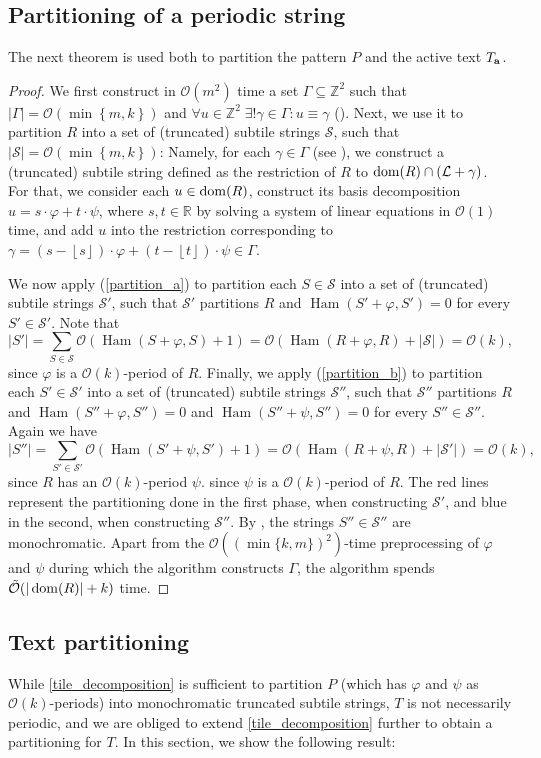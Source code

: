 \documentclass[11pt, letterpaper]{article}
\theoremstyle{plain}
\theoremstyle{definition}
\theoremstyle{remark}
\newcommand{\R}{\mathbb{R}}
\newcommand{\Z}{\mathbb{Z}}
\renewcommand{\O}{\mathcal{O}}
\newcommand{\tO}{\tilde{\mathcal{O}}}
\renewcommand{\S}{\mathcal{S}}
\renewcommand{\L}{\mathcal{L}}
\renewcommand{\phi}{\varphi}
\newcommand{\floor}[1]{\left\lfloor #1 \right\rfloor}
\newcommand{\set}[1]{\left\lbrace #1 \right\rbrace}
\DeclareMathOperator*{\Ham}{Ham}
\begin{document}
\subsection{Partitioning of a periodic string}
The next theorem is used both to partition the pattern $P$ and the active text $T_\mathbf{a}$.

\tileDecomposition
\begin{proof}
We first construct in $\O(m^2)$ time a set $\Gamma \subseteq \Z^2$ such that $|\Gamma| = \O(\min\set{m, k})$ and $\forall u \in \Z^2 \; \exists! \gamma \in \Gamma : u \equiv \gamma$ (). Next, we use it to partition $R$ into a set of (truncated) subtile strings $\S$, such that $|\S| = \O(\min\set{m, k})$: Namely, for each $\gamma \in \Gamma$ (see ), we construct a (truncated) subtile string defined as the restriction of $R$ to $\d{R} \cap (\L + \gamma)$. For that, we consider each $u \in \operatorname*{dom}(R)$, construct its basis decomposition $u = s\cdot \phi + t\cdot \psi$, where $s,t\in \R$ by solving a system of linear equations in $\O(1)$ time, and add $u$ into the restriction corresponding to $\gamma = (s-\floor{s}) \cdot \phi + (t-\floor{t}) \cdot \psi \in \Gamma$. 

	We now apply  (\ref{partition_a}) to partition each $S \in \S$  into a set of (truncated) subtile strings $\S'$, such that $\S'$ partitions $R$ and $\Ham(S' + \phi, S') = 0$ for every $S' \in \S'$.
	Note that
	\[ |S'| = \sum_{S \in \S} \O(\Ham(S + \phi, S) + 1) = \O(\Ham(R + \phi, R) + |\S|) = \O(k),\]
	since $\phi$ is a $\O(k)$-period of $R$.
	Finally, we apply   (\ref{partition_b}) to partition each $S' \in \S'$ into a set of (truncated) subtile strings $\S''$, such that $\S''$ partitions $R$ and $\Ham(S'' + \phi, S'') = 0$ and $\Ham(S'' + \psi, S'') = 0$ for every $S'' \in \S''$.
	Again we have
	\[ |S''| = \sum_{S' \in \S'} \O(\Ham(S' + \psi, S') + 1) = \O(\Ham(R + \psi, R) + |\S'|) = \O(k),\]
	since $R$ has an $\O(k)$-period $\psi$.
	since $\psi$ is a $\O(k)$-period of $R$.
	The red lines represent the partitioning done in the first phase, when constructing $\S'$, and blue in the second, when constructing $\S''$.
	By , the strings $S'' \in \S''$ are monochromatic.
	Apart from the $\O((\min\{k,m\})^2)$-time preprocessing of $\phi$ and $\psi$ during which the algorithm constructs $\Gamma$, the algorithm spends $\tO(|\d{R}| + k)$ time.
\end{proof}


\subsection{Text partitioning}
While \cref{tile_decomposition} is sufficient to partition $P$ (which has $\phi$ and $\psi$ as $\O(k)$-periods) into monochromatic truncated subtile strings, $T$ is not necessarily periodic, and we are obliged to extend \cref{tile_decomposition} further to obtain a partitioning for $T$. In this section, we show the following result:
\end{document}
